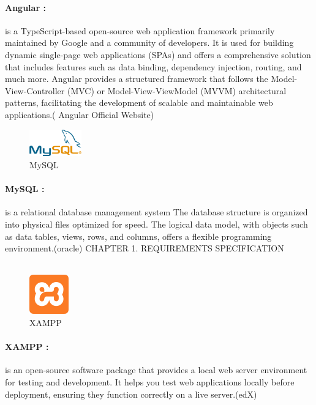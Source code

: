 \documentclass{article}
\begin{document}
\paragraph{Angular :} 
is a TypeScript-based open-source web application framework primarily maintained by Google and a community of developers. It is used for building dynamic single-page web applications (SPAs) and offers a comprehensive solution that includes features such as data binding, dependency injection, routing, and much more. Angular provides a structured framework that follows the Model-View-Controller (MVC) or Model-View-ViewModel (MVVM) architectural patterns, facilitating the development of scalable and maintainable web applications.( Angular Official Website)
\vspace{1cm}

\begin{figure}[htbp]
    \centering
    \includegraphics[width=0.2\textwidth]{aaaa}
    \caption{MySQL}
    \label{fig:design4}
\end{figure}
\paragraph{MySQL :} 
is a relational database management system
The database structure is organized into physical files optimized for speed. The logical data model, with objects such as data tables, views, rows, and columns, offers a flexible programming environment.(oracle)
\vspace{1cm} 
\newpage
\noindent
CHAPTER 1.  REQUIREMENTS SPECIFICATION \\
\underline{\hspace{\textwidth}} \vspace{0.2cm}\\
\begin{figure}[htbp]
    \centering
    \includegraphics[width=0.15\textwidth]{fff}
    \caption{XAMPP }
    \label{fig:design5}
\end{figure}
\paragraph{XAMPP :} 
is an open-source software package that provides a local web server environment for testing and development. It helps you test web applications locally before deployment, ensuring they function correctly on a live server.(edX)
\vspace{1cm}
\end{document}
